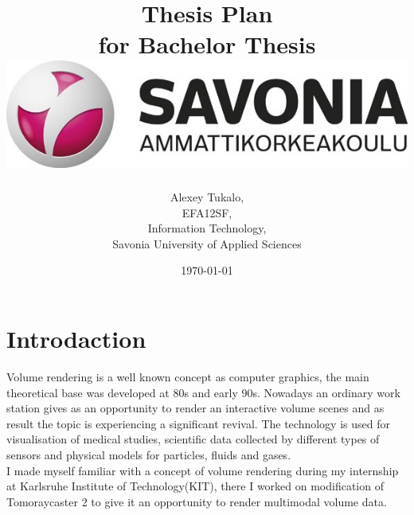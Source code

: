 \documentclass[english]{article}
\date{}
\begin{document}
\title{\vspace{2in}Thesis Plan\\
\small for Bachelor Thesis\\
\vspace{0.5in}\includegraphics{savonia.jpg}}

\nopagebreak
\maketitle


\vspace{3in}

\author{
\begin{flushright}
Alexey Tukalo,\\
EFA12SF,\\
Information Technology,\\
Savonia University of Applied Sciences
\end{flushright}
}

\date{\today}
\thispagestyle{empty}
\newpage
\setcounter{page}{1}

\section{Introdaction}

Volume rendering is a well known concept as computer graphics, the main theoretical base was developed at 80s and early 90s. Nowadays an ordinary work station gives as an opportunity to render an interactive volume scenes and as result the topic is experiencing a significant revival. The technology is used for visualisation of medical studies, scientific data collected by different types of sensors and physical models for particles, fluids and gases.\\

I made myself familiar with a concept of volume rendering during my internship at Karlsruhe Institute of Technology(KIT), there I worked on modification of Tomoraycaster 2 to give it an opportunity to render multimodal volume data.\\
\end{document}
